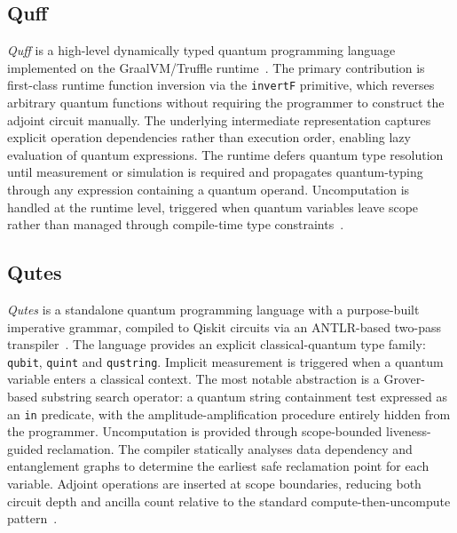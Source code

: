 \subsection{Quff}\label{subsec:pub_qpl_review:language_descriptions:quff}
\textit{Quff} is a high-level dynamically typed quantum programming language implemented on the GraalVM/Truffle runtime~\cite{wright2024quff}.
The primary contribution is first-class runtime function inversion via the \texttt{invertF} primitive, which reverses arbitrary quantum functions without requiring the programmer to construct the adjoint circuit manually.
The underlying intermediate representation captures explicit operation dependencies rather than execution order, enabling lazy evaluation of quantum expressions.
The runtime defers quantum type resolution until measurement or simulation is required and propagates quantum-typing through any expression containing a quantum operand.
Uncomputation is handled at the runtime level, triggered when quantum variables leave scope rather than managed through compile-time type constraints~\cite{wright2024quff}.

\subsection{Qutes}\label{subsec:pub_qpl_review:language_descriptions:qutes}
\textit{Qutes} is a standalone quantum programming language with a purpose-built imperative grammar, compiled to Qiskit circuits via an ANTLR-based two-pass transpiler~\cite{faro2025qutes}.
The language provides an explicit classical-quantum type family: \texttt{qubit}, \texttt{quint} and \texttt{qustring}.
Implicit measurement is triggered when a quantum variable enters a classical context.
The most notable abstraction is a Grover-based substring search operator: a quantum string containment test expressed as an \texttt{in} predicate, with the amplitude-amplification procedure entirely hidden from the programmer.
Uncomputation is provided through scope-bounded liveness-guided reclamation.
The compiler statically analyses data dependency and entanglement graphs to determine the earliest safe reclamation point for each variable.
Adjoint operations are inserted at scope boundaries, reducing both circuit depth and ancilla count relative to the standard compute-then-uncompute pattern~\cite{faro2025qutes,reversiblelifetime2026}.

